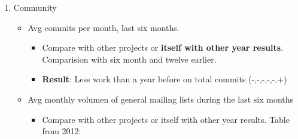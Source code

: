 \documentclass[11pt]{scrartcl}
\begin{document}
\begin{enumerate}
\begin{itemize}
	    \item Documentation
    	    \begin{itemize}
                \item Online tutorials - Development
                \item Offline tutorials - SVNBook\footnote{http://svnbook.red-bean.com/}
                \item Hello World - Tutorial to initialize a Repository in 10 minutes.
                \item Books from the author, authors or company -  SVNBook
                \item Languages - Various Languages (Deutsch | English | French | Espa\~nol | Italiano | Japanese | Noruego | Portugu\'es | Russo | Chinese)
            \end{itemize}
    \end{itemize}

    \item Community
    \begin{itemize}
	    \item Avg commits per month, last six months.
	        \begin{itemize}
                \item Compare with other projects or \textbf{itself with other year results}. Comparision with six month and twelve earlier.
                \item \textbf{Result}: Less work than a year before on total commits (-,-,-,-,-,+)
            \end{itemize}
	    \item Avg monthly volumen of general mailing lists during the last six months
	    \begin{itemize}
            \item Compare with other projects or itself with other year results. Table from 2012:


\end{itemize}
\end{itemize}
\end{enumerate}
\end{document}
